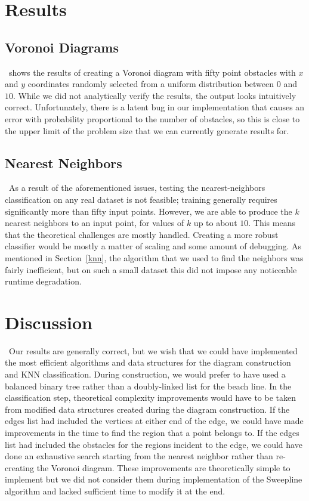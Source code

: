 \documentclass[conference]{IEEEtran}
\begin{document}
\section{Results}
\subsection{Voronoi Diagrams}
\noindent\ shows the results of creating a Voronoi diagram with fifty
point obstacles with $x$ and $y$ coordinates randomly selected from a uniform
distribution between $0$ and $10$. While we did not analytically verify the
results, the output looks intuitively correct. Unfortunately, there is a latent
bug in our implementation that causes an error with probability proportional
to the number of obstacles, so this is close to the upper limit of the problem
size that we can currently generate results for.

\subsection{Nearest Neighbors}
\noindent\ As a result of the aforementioned issues, testing the nearest-neighbors
classification on any real dataset is not feasible; training generally requires
significantly more than fifty input points. However, we are able to produce the
$k$ nearest neighbors to an input point, for values of $k$ up to about $10$.
This means that the theoretical challenges are mostly handled. Creating a more
robust classifier would be mostly a matter of scaling and some amount of
debugging. As mentioned in Section~\ref{knn}, the algorithm that we used
to find the neighbors was fairly inefficient, but on such a small dataset this
did not impose any noticeable runtime degradation.

\section{Discussion}
\noindent\ Our results are generally correct, but we wish that we could have
implemented the most efficient algorithms and data structures for the diagram
construction and KNN classification. During construction, we would prefer to
have used a balanced binary tree rather than a doubly-linked list for the beach
line. In the classification step, theoretical complexity improvements would have
to be taken from modified data structures created during the diagram construction.
If the edges list had included the vertices at either end of the edge, we could
have made improvements in the time to find the region that a point belongs to.
If the edges list had included the obstacles for the regions incident to the
edge, we could have done an exhaustive search starting from the nearest neighbor
rather than re-creating the Voronoi diagram. These improvements are theoretically
simple to implement but we did not consider them during implementation of the
Sweepline algorithm and lacked sufficient time to modify it at the end.
\end{document}
